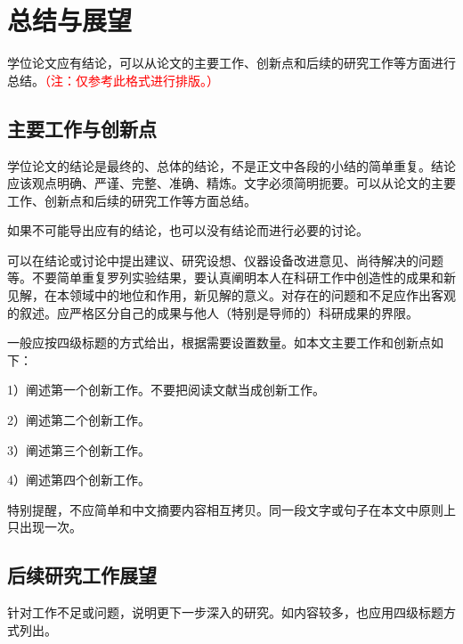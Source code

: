 \chapter{总结与展望}

学位论文应有结论，可以从论文的主要工作、创新点和后续的研究工作等方面进行总结。\textcolor{red}{（注：仅参考此格式进行排版。）}

\section{主要工作与创新点}

学位论文的结论是最终的、总体的结论，不是正文中各段的小结的简单重复。结论应该观点明确、严谨、完整、准确、精炼。文字必须简明扼要。可以从论文的主要工作、创新点和后续的研究工作等方面总结。

如果不可能导出应有的结论，也可以没有结论而进行必要的讨论。

可以在结论或讨论中提出建议、研究设想、仪器设备改进意见、尚待解决的问题等。不要简单重复罗列实验结果，要认真阐明本人在科研工作中创造性的成果和新见解，在本领域中的地位和作用，新见解的意义。对存在的问题和不足应作出客观的叙述。应严格区分自己的成果与他人（特别是导师的）科研成果的界限。

一般应按四级标题的方式给出，根据需要设置数量。如本文主要工作和创新点如下：

1）阐述第一个创新工作。不要把阅读文献当成创新工作。

2）阐述第二个创新工作。

3）阐述第三个创新工作。

4）阐述第四个创新工作。

特别提醒，不应简单和中文摘要内容相互拷贝。同一段文字或句子在本文中原则上只出现一次。

\section{后续研究工作展望}

针对工作不足或问题，说明更下一步深入的研究。如内容较多，也应用四级标题方式列出。

\newpage\quad %